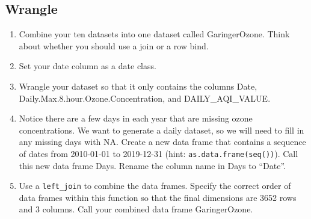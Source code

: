 \documentclass[]{article}
\begin{document}
\hypertarget{wrangle}{%
\subsection{Wrangle}\label{wrangle}}

\begin{enumerate}
\def\labelenumi{\arabic{enumi}.}
\setcounter{enumi}{1}
\item
  Combine your ten datasets into one dataset called GaringerOzone. Think
  about whether you should use a join or a row bind.
\item
  Set your date column as a date class.
\item
  Wrangle your dataset so that it only contains the columns Date,
  Daily.Max.8.hour.Ozone.Concentration, and DAILY\_AQI\_VALUE.
\item
  Notice there are a few days in each year that are missing ozone
  concentrations. We want to generate a daily dataset, so we will need
  to fill in any missing days with NA. Create a new data frame that
  contains a sequence of dates from 2010-01-01 to 2019-12-31 (hint:
  \texttt{as.data.frame(seq())}). Call this new data frame Days. Rename
  the column name in Days to ``Date''.
\item
  Use a \texttt{left\_join} to combine the data frames. Specify the
  correct order of data frames within this function so that the final
  dimensions are 3652 rows and 3 columns. Call your combined data frame
  GaringerOzone.
\end{enumerate}
\end{document}
